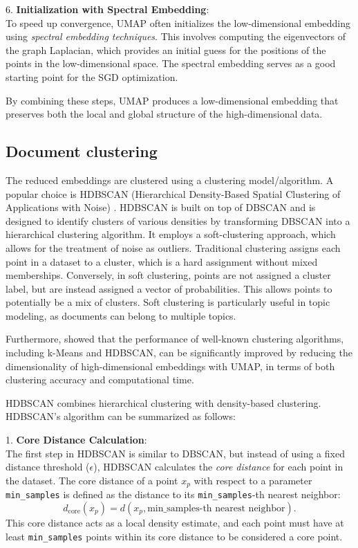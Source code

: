 6. \textbf{Initialization with Spectral Embedding}:\\
To speed up convergence, UMAP often initializes the low-dimensional embedding using \textit{spectral embedding techniques}. This involves computing the eigenvectors of the graph Laplacian, which provides an initial guess for the positions of the points in the low-dimensional space. The spectral embedding serves as a good starting point for the SGD optimization.

By combining these steps, UMAP produces a low-dimensional embedding that preserves both the local and global structure of the high-dimensional data.

\subsection{Document clustering}

The reduced embeddings are clustered using a clustering model/algorithm. A popular choice is HDBSCAN (Hierarchical Density-Based Spatial Clustering of Applications with Noise) \cite{campello_density-based_2013, campello_hierarchical_2015, mcinnes_accelerated_2017, mcinnes_hdbscan_2017}. HDBSCAN is built on top of DBSCAN \cite{ester_density-based_nodate} and is designed to identify clusters of various densities by transforming DBSCAN into a hierarchical clustering algorithm. It employs a soft-clustering approach, which allows for the treatment of noise as outliers. Traditional clustering assigns each point in a dataset to a cluster, which is a hard assignment without mixed memberships. Conversely, in soft clustering, points are not assigned a cluster label, but are instead assigned a vector of probabilities. This allows points to potentially be a mix of clusters. Soft clustering is particularly useful in topic modeling, as documents can belong to multiple topics.

Furthermore, \citet{allaoui_considerably_2020} showed that the performance of well-known clustering algorithms, including k-Means and HDBSCAN, can be significantly improved by reducing the dimensionality of high-dimensional embeddings with UMAP, in terms of both clustering accuracy and computational time.

HDBSCAN combines hierarchical clustering with density-based clustering. HDBSCAN's algorithm can be summarized as follows:

1. \textbf{Core Distance Calculation}: \\
The first step in HDBSCAN is similar to DBSCAN, but instead of using a fixed distance threshold ($\epsilon$), HDBSCAN calculates the \textit{core distance} for each point in the dataset. The core distance of a point $x_p$ with respect to a parameter \texttt{min\_samples} is defined as the distance to its \texttt{min\_samples}-th nearest neighbor:
\[
    d_{\text{core}}(x_p) = d(x_p, \text{min\_samples-th nearest neighbor}).
\]
This core distance acts as a local density estimate, and each point must have at least \texttt{min\_samples} points within its core distance to be considered a core point.


